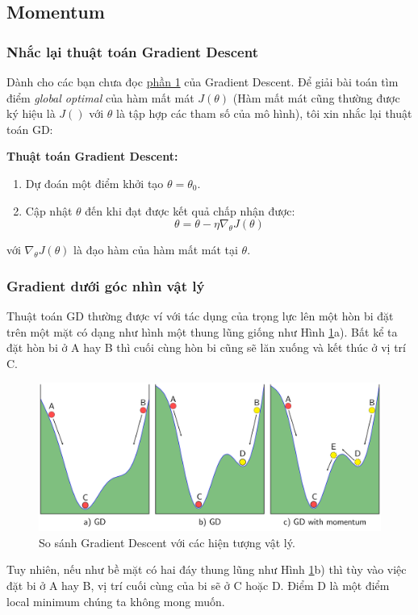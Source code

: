  
\subsection{Momentum}
 
\subsubsection{Nhắc lại thuật toán Gradient Descent}
Dành cho các bạn chưa đọc \href{http://machinelearningcoban.com/2017/01/12/gradientdescent/}{phần 1} của Gradient Descent. Để giải bài toán tìm điểm \textit{global optimal} của hàm mất mát $J(\theta)$ (Hàm mất mát cũng thường được ký hiệu là $J()$ với $\theta$ là tập hợp các tham số của mô hình), tôi xin nhắc lại thuật toán GD: 
 
\textbf{Thuật toán Gradient Descent:} 
\begin{enumerate}
    \item  Dự đoán một điểm khởi tạo $\theta = \theta_0$. 
    \item  Cập nhật $\theta$ đến khi đạt được kết quả chấp nhận được:  
\begin{equation} 
\theta = \theta - \eta \nabla_{\theta}J(\theta) 
\end{equation} 
\end{enumerate}
với $\nabla_{\theta}J(\theta)$ là đạo hàm của hàm mất mát tại $\theta$. 
 
 
\subsubsection{Gradient dưới góc nhìn vật lý }
 
Thuật toán GD thường được ví với tác dụng của trọng lực lên một hòn bi đặt trên một mặt có dạng như hình một thung lũng giống như Hình \ref{fig:8_1}a). Bất kể ta đặt hòn bi ở A hay B thì cuối cùng hòn bi cũng sẽ lăn xuống và kết thúc ở vị trí C. 
 
\begin{figure}[t]
\centering
    \includegraphics[width = \textwidth]{Chapters/04_GradientDescent/GD/momentum.png}
    \caption[]{So sánh Gradient Descent với các hiện tượng vật lý.}
    \label{fig:8_1}
\end{figure}
Tuy nhiên, nếu như bề mặt có hai đáy thung lũng như Hình \ref{fig:8_1}b) thì tùy vào việc đặt bi ở A hay B, vị trí cuối cùng của bi sẽ ở C hoặc D. Điểm D là một điểm local minimum chúng ta không mong muốn.  
 
